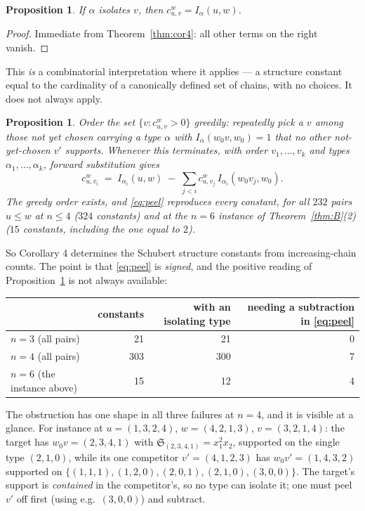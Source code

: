 \documentclass[11pt]{article}
\theoremstyle{plain}
\newtheorem{proposition}[theorem]{Proposition}
\theoremstyle{definition}
\newcommand{\wo}{w_0}
\begin{document}
\begin{proposition}\label{prop:iso}
If $\alpha$ isolates $v$, then $c^w_{u,v}=I_\alpha(u,w)$.
\end{proposition}

\begin{proof}
Immediate from Theorem~\ref{thm:cor4}: all other terms on the right vanish.
\end{proof}

This \emph{is} a combinatorial interpretation where it applies --- a structure
constant equal to the cardinality of a canonically defined set of chains, with no
choices.  It does not always apply.

\begin{proposition}\label{prop:peel}
Order the set $\{v:c^w_{u,v}>0\}$ greedily: repeatedly pick a $v$ among those not
yet chosen carrying a type $\alpha$ with $I_\alpha(\wo v,\wo)=1$ that no
\emph{other} not-yet-chosen $v'$ supports.  Whenever this terminates, with order
$v_1,\dots,v_k$ and types $\alpha_1,\dots,\alpha_k$, forward substitution gives
\begin{equation}\label{eq:peel}
  c^w_{u,v_i}\;=\;I_{\alpha_i}(u,w)\;-\;\sum_{j<i}c^w_{u,v_j}\,
     I_{\alpha_i}(\wo v_j,\wo).
\end{equation}
The greedy order exists, and \eqref{eq:peel} reproduces every constant, for all
$232$ pairs $u\le w$ at $n\le4$ ($324$ constants) and at the $n=6$ instance of
Theorem~\ref{thm:B}(2) ($15$ constants, including the one equal to $2$).
\end{proposition}

So Corollary 4 determines the Schubert structure constants from increasing-chain
counts.  The point is that \eqref{eq:peel} is \emph{signed}, and the positive
reading of Proposition~\ref{prop:iso} is not always available:

\begin{center}
\begin{tabular}{lrrr}
\toprule
 & constants & with an isolating type & needing a subtraction in \eqref{eq:peel}\\
\midrule
$n=3$ (all pairs) & 21 & 21 & 0\\
$n=4$ (all pairs) & 303 & 300 & 7\\
$n=6$ (the instance above) & 15 & 12 & 4\\
\bottomrule
\end{tabular}
\end{center}

The obstruction has one shape in all three failures at $n=4$, and it is visible
at a glance.  For instance at $u=(1,3,2,4)$, $w=(4,2,1,3)$, $v=(3,2,1,4)$: the
target has $\wo v=(2,3,4,1)$ with
$\mathfrak{S}_{(2,3,4,1)}=x_1^2x_2$, supported on the single type $(2,1,0)$,
while its one competitor $v'=(4,1,2,3)$ has $\wo v'=(1,4,3,2)$ supported on
$\{(1,1,1),(1,2,0),(2,0,1),(2,1,0),(3,0,0)\}$.  The target's support is
\emph{contained} in the competitor's, so no type can isolate it; one must peel
$v'$ off first (using e.g.\ $(3,0,0)$) and subtract.
\end{document}
